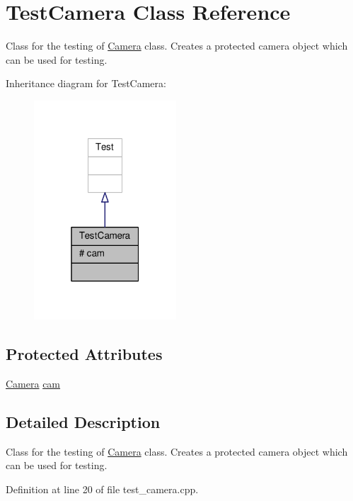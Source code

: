 \hypertarget{class_test_camera}{}\section{Test\+Camera Class Reference}
\label{class_test_camera}


Class for the testing of \hyperlink{class_camera}{Camera} class. Creates a protected camera object which can be used for testing.  




Inheritance diagram for Test\+Camera\+:\nopagebreak
\begin{figure}[H]
\begin{center}
\leavevmode
\includegraphics[width=151pt]{class_test_camera__inherit__graph}
\end{center}
\end{figure}
\subsection*{Protected Attributes}
\begin{DoxyCompactItemize}
\item 
\hyperlink{class_camera}{Camera} \hyperlink{class_test_camera_ac1abc17c2f7f776456583bc3a60db3a9}{cam}
\end{DoxyCompactItemize}


\subsection{Detailed Description}
Class for the testing of \hyperlink{class_camera}{Camera} class. Creates a protected camera object which can be used for testing. 

Definition at line 20 of file test\+\_\+camera.\+cpp.



